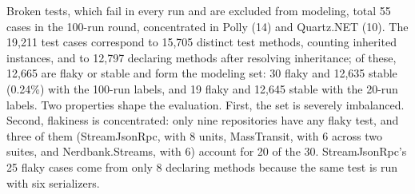 Broken tests, which fail in every run and are excluded from modeling, total 55 cases in the 100-run round, concentrated in Polly (14) and Quartz.NET (10). The 19,211 test cases correspond to 15,705 distinct test methods, counting inherited instances, and to 12,797 declaring methods after resolving inheritance; of these, 12,665 are flaky or stable and form the modeling set: 30 flaky and 12,635 stable (0.24\%) with the 100-run labels, and 19 flaky and 12,645 stable with the 20-run labels. Two properties shape the evaluation. First, the set is severely imbalanced. Second, flakiness is concentrated: only nine repositories have any flaky test, and three of them (StreamJsonRpc, with 8 units, MassTransit, with 6 across two suites, and Nerdbank.Streams, with 6) account for 20 of the 30. StreamJsonRpc's 25 flaky cases come from only 8 declaring methods because the same test is run with six serializers.